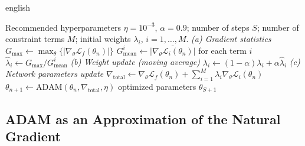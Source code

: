 \documentclass[11pt,letterpaper,twoside,openright]{book} %
\newcommand{\abs}[1]{\left\lvert #1 \right\rvert}
\newcommand{\Loss}{\mathcal{L}}
\begin{document}
\begin{hyphenrules}{english}
\begin{algorithm}[htbp]
  \caption{Learning rate annealing with ADAM.}
  \label{alg:lra}
  \begin{algorithmic}[1]
    \Require Recommended hyperparameters $\eta=10^{-3}$, $\alpha=0.9$; number of steps $S$; number of
      constraint terms $M$; initial weights $\lambda_i$, $i=1,\dots,M$.
      \State \textit{(a) Gradient statistics}
      \State $G_{\max}\gets\max_\theta\{\abs{\nabla_\theta\Loss_f(\theta_n)}\}$ 
      \State $G^{i}_{\mathrm{mean}}\gets\overline{\abs{\nabla_\theta\Loss_i(\theta_n)}}$ for each term $i$
      \State $\hat\lambda_i\gets G_{\max}/G^{i}_{\mathrm{mean}}$ 
      \State \textit{(b) Weight update (moving average)}
      \State $\lambda_i\gets(1-\alpha)\lambda_i+\alpha\hat\lambda_i$ 
      \State \textit{(c) Network parameters update}
      \State $\nabla_{\mathrm{total}}\gets\nabla_\theta\Loss_f(\theta_n)+\sum_{i=1}^{M}\lambda_i\nabla_\theta\Loss_i(\theta_n)$
      \State $\theta_{n+1}\gets\mathrm{ADAM}(\theta_n,\nabla_{\mathrm{total}},\eta)$ 
    \EndFor
    \State \Return optimized parameters $\theta_{S+1}$
  \end{algorithmic}
\end{algorithm}

\subsection{ADAM as an Approximation of the Natural Gradient}


\end{hyphenrules}
\end{document}
